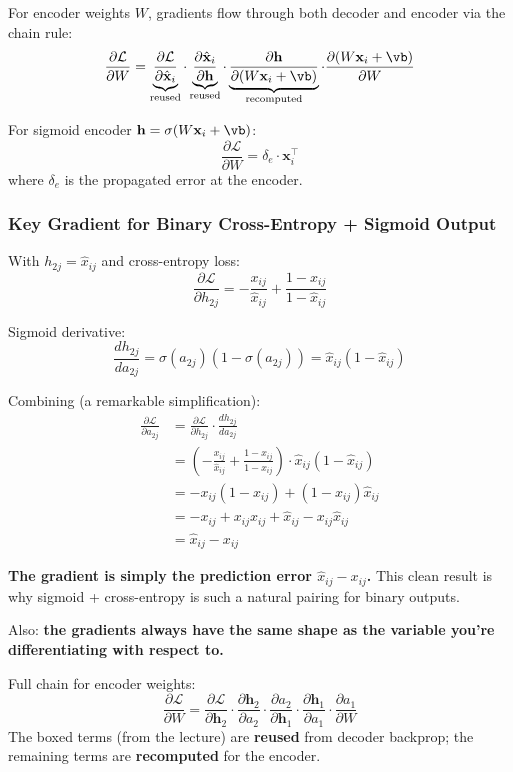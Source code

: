 \documentclass[12pt,a4paper]{article}
\newcommand{\vx}{\mathbf{x}}
\newcommand{\vh}{\mathbf{h}}
\newcommand{\hatx}{\hat{\mathbf{x}}}
\newcommand{\Loss}{\mathcal{L}}
\begin{document}
For encoder weights $W$, gradients flow through both decoder and encoder via the chain rule:
\[
\frac{\partial\Loss}{\partial W}
= \underbrace{\frac{\partial\Loss}{\partial\hatx_i}}_{\text{reused}}
  \cdot \underbrace{\frac{\partial\hatx_i}{\partial\vh}}_{\text{reused}}
  \cdot \underbrace{\frac{\partial\vh}{\partial(W\vx_i+\vb)}}_{\text{recomputed}}
  \cdot \frac{\partial(W\vx_i+\vb)}{\partial W}
\]

For sigmoid encoder $\vh = \sigma(W\vx_i + \vb)$:
\[
\frac{\partial\Loss}{\partial W} = \delta_e \cdot \vx_i^\top
\]
where $\delta_e$ is the propagated error at the encoder.

\subsubsection{Key Gradient for Binary Cross-Entropy + Sigmoid Output}

With $h_{2j} = \hat{x}_{ij}$ and cross-entropy loss:
\[
\frac{\partial\Loss}{\partial h_{2j}}
= -\frac{x_{ij}}{\hat{x}_{ij}} + \frac{1-x_{ij}}{1-\hat{x}_{ij}}
\]

Sigmoid derivative:
\[
\frac{dh_{2j}}{da_{2j}} = \sigma(a_{2j})(1 - \sigma(a_{2j})) = \hat{x}_{ij}(1-\hat{x}_{ij})
\]

Combining (a remarkable simplification):
\begin{align*}
\frac{\partial\Loss}{\partial a_{2j}}
&= \frac{\partial\Loss}{\partial h_{2j}} \cdot \frac{dh_{2j}}{da_{2j}}\\
&= \left(-\frac{x_{ij}}{\hat{x}_{ij}} + \frac{1-x_{ij}}{1-\hat{x}_{ij}}\right) \cdot \hat{x}_{ij}(1-\hat{x}_{ij})\\
&= -x_{ij}(1-\hat{x}_{ij}) + (1-x_{ij})\hat{x}_{ij}\\
&= -x_{ij} + x_{ij}\hat{x}_{ij} + \hat{x}_{ij} - x_{ij}\hat{x}_{ij}\\
&= \hat{x}_{ij} - x_{ij}
\end{align*}

\begin{keybox}
\textbf{The gradient is simply the prediction error $\hat{x}_{ij} - x_{ij}$.} This clean result is why sigmoid + cross-entropy is such a natural pairing for binary outputs.

Also: \textbf{the gradients always have the same shape as the variable you're differentiating with respect to.}
\end{keybox}

Full chain for encoder weights:
\[
\frac{\partial\Loss}{\partial W}
= \frac{\partial\Loss}{\partial\vh_2}
  \cdot \frac{\partial\vh_2}{\partial a_2}
  \cdot \frac{\partial a_2}{\partial\vh_1}
  \cdot \frac{\partial\vh_1}{\partial a_1}
  \cdot \frac{\partial a_1}{\partial W}
\]
The boxed terms (from the lecture) are \textbf{reused} from decoder backprop; the remaining terms are \textbf{recomputed} for the encoder.
\end{document}
